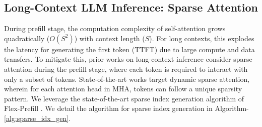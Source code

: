\documentclass[conference]{IEEEtran}
\begin{document}
\subsection{Long-Context LLM Inference: Sparse Attention}
\label{Sec_Long_context_LLM}
During prefill stage, the computation complexity of self-attention grows quadratically  ($O(S^2)$) with context length ($S$). For long contexts, this explodes the latency for generating the first token (TTFT) due to large compute and data transfers. To mitigate this, prior works on long-context inference consider sparse attention during the prefill stage, where each token is required to interact with only a subset of tokens. State-of-the-art works target dynamic sparse attention, wherein for each attention head in MHA, tokens can follow a unique sparsity pattern. We leverage the state-of-the-art sparse index generation algorithm of Flex-Prefill \cite{flexprefill}. We detail the algorithm for sparse index generation in Algorithm-\ref{alg:sparse_idx_gen}.
\end{document}
